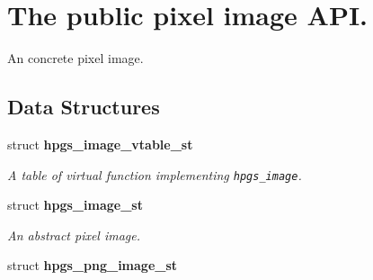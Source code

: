 \section{The public pixel image API.}
\label{group__image}
An concrete pixel image.  
\subsection*{Data Structures}
\begin{CompactItemize}
\item 
struct {\bf hpgs\_\-image\_\-vtable\_\-st}
\begin{CompactList}\small\item\em A table of virtual function implementing {\tt hpgs\_\-image}. \item\end{CompactList}\item 
struct {\bf hpgs\_\-image\_\-st}
\begin{CompactList}\small\item\em An abstract pixel image. \item\end{CompactList}\item 
struct \textbf{hpgs\_\-png\_\-image\_\-st}
\end{CompactItemize}
